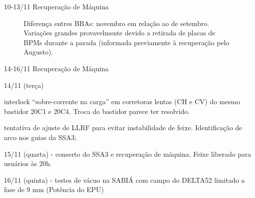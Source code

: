 \documentclass{beamer}					  %
\begin{document}
\begin{frame}{10-13/11 Recuperação de Máquina}
\begin{minipage}{0.58\textwidth}
\begin{figure}[H]
            \caption{\tiny{Diferença entres BBAs: novembro em relação ao de setembro. Variações grandes provavelmente devido a retirada de placas de BPMs durante a parada (informada previamente à recuperação pelo Augusto).}}
            \label{fig:bba}
        \end{figure}
    \end{minipage}
\end{frame}
\begin{frame}{14-16/11 Recuperação de Máquina}
    \begin{minipage}{0.45\textwidth}
        \begin{itemize}
        \scriptsize{
            \item 14/11 (terça) 
            \begin{itemize}
            \scriptsize{
                \item interlock ``sobre-corrente na carga'' em corretoras lentas (CH e CV) do mesmo bastidor 20C1 e 20C4. Troca do bastidor parece ter resolvido. 
                \item tentativa de ajuste de LLRF para evitar instabilidade de feixe. Identificação de arco nos guias da SSA3;}
            \end{itemize}
            \item 15/11 (quarta) - conserto do SSA3 e recuperação de máquina. Feixe liberado para usuários às 20h.
            \item 16/11 (quinta) - testes de vácuo na SABIÁ com campo do DELTA52 limitado a fase de 9 mm (Potência do EPU)}
    	\end{itemize}
    \end{minipage}
    \begin{minipage}{0.53\textwidth}
        \captionsetup[figure]{font=tiny}
        \begin{figure}[H]
        	\centering

\end{figure}
\end{minipage}
\end{frame}
\end{document}
